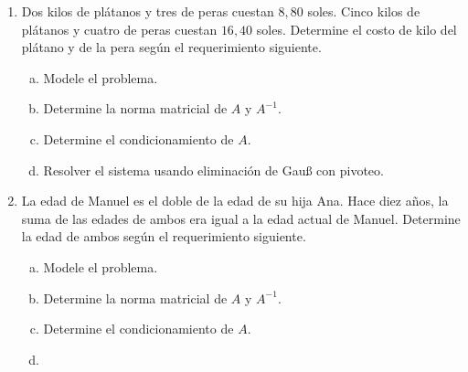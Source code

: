 \documentclass[
	spanish,
	9pt,
	utf8,
	xcolor=table,
	handout,
	aspectratio=1610,
	professionalfonts,
	notheorems,
	mathserif,
]{beamer}
\newcounter{savedenum}
\newcommand*{\resume}{\setcounter{enumi}{\thesavedenum}}
\begin{document}
\begin{frame}
	\begin{enumerate}
		\resume

		\item
		      Dos kilos de plátanos y tres de peras cuestan $8,80$ soles.
		      Cinco kilos de plátanos y cuatro de peras
		      cuestan $16,40$ soles.
		      Determine el costo de kilo del plátano y de la pera según el requerimiento siguiente.

		      \begin{multicols}{2}
			      \begin{enumerate}[a)]
				      \item

				            Modele el problema.

				      \item

				            Determine la norma matricial de $A$ y $A^{-1}$.

				      \item

				            Determine el condicionamiento de $A$.

				      \item

				            Resolver el sistema usando eliminación de Gauß con pivoteo.
			      \end{enumerate}
		      \end{multicols}

		\item
		      La edad de Manuel es el doble de la edad de su hija Ana.
		      Hace diez años, la suma de las edades de
		      ambos era igual a la edad actual de Manuel.
		      Determine la edad de ambos según el requerimiento siguiente.
		      \begin{multicols}{2}
			      \begin{enumerate}[a)]
				      \item

				            Modele el problema.

				      \item

				            Determine la norma matricial de $A$ y $A^{-1}$.

				      \item

				            Determine el condicionamiento de $A$.

				      \item


\end{enumerate}
\end{multicols}
\end{enumerate}
\end{frame}
\end{document}
